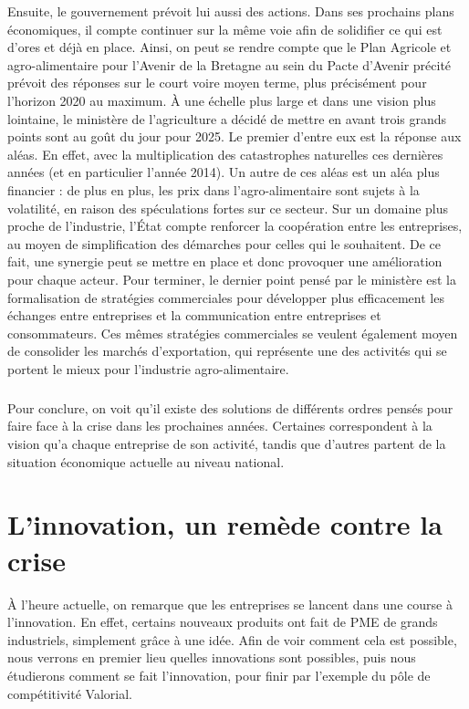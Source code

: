 \documentclass[a4paper,12pt]{report}
\begin{document}
			Ensuite, le gouvernement prévoit lui aussi des actions. Dans ses prochains plans économiques, il compte continuer sur la même voie afin de solidifier ce qui est d’ores et déjà en place. Ainsi, on peut se rendre compte que le Plan Agricole et agro-alimentaire pour l’Avenir de la Bretagne au sein du Pacte d’Avenir précité prévoit des réponses sur le court voire moyen terme, plus précisément pour l’horizon 2020 au maximum\cite{PacteAvenirBretagne}. À une échelle plus large et dans une vision plus lointaine, le ministère de l’agriculture a décidé de mettre en avant trois grands points sont au goût du jour pour 2025\cite{AvenirFiliereAgricole2025}. Le premier d’entre eux est la réponse aux aléas. En effet, avec la multiplication des catastrophes naturelles ces dernières années (et en particulier l’année 2014). Un autre de ces aléas est un aléa plus financier : de plus en plus, les prix dans l’agro-alimentaire sont sujets à la volatilité, en raison des spéculations fortes sur ce secteur. Sur un domaine plus proche de l’industrie, l’État compte renforcer la coopération entre les entreprises, au moyen de simplification des démarches pour celles qui le souhaitent. De ce fait, une synergie peut se mettre en place et donc provoquer une amélioration pour chaque acteur. Pour terminer, le dernier point pensé par le ministère est la formalisation de stratégies commerciales pour développer plus efficacement les échanges entre entreprises et la communication entre entreprises et consommateurs. Ces mêmes stratégies commerciales se veulent également moyen de consolider les marchés d’exportation, qui représente une des activités qui se portent le mieux pour l’industrie agro-alimentaire.
			
			\paragraph{}Pour conclure, on voit qu’il existe des solutions de différents ordres pensés pour faire face à la crise dans les prochaines années. Certaines correspondent à la vision qu’a chaque entreprise de son activité, tandis que d’autres partent de la situation économique actuelle au niveau national.
			
\chapter{L'innovation, un remède contre la crise}
	À l'heure actuelle, on remarque que les entreprises se lancent dans une course à l'innovation. En effet, certains nouveaux produits ont fait de PME de grands industriels, simplement grâce à une idée. Afin de voir comment cela est possible, nous verrons en premier lieu quelles innovations sont possibles, puis nous étudierons comment se fait l'innovation, pour finir par l'exemple du pôle de compétitivité Valorial.
	
\end{document}
